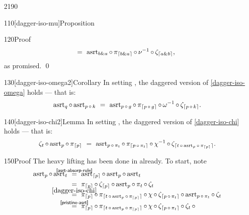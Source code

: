 \begin{parsec}{2190}
\begin{point}{110}[dagger-iso-mu]{Proposition}
\begin{point}{120}{Proof}
\begin{alignat*}{2}
        &\ = \ 
        \asrt_{\andthen{b}{a}}
        \after \pi_{\ceil{\andthen{b}{a}}} 
        \after \nu^{-1} \after \zeta_{\ceil{\andthen{a}{b}}},
\end{alignat*}
as promised. \qed
\end{point}
\end{point}
\begin{point}{130}[dagger-iso-omega2]{Corollary}
In setting ,
    the daggered version of
        \eqref{dagger-iso-omega} holds --- that is:
    \begin{equation*}
\asrt_q \after
\asrt_{p \after k}
    \ =\ 
    \asrt_{p \after g} \after
    \pi_{\ceil{p \after g}} \after
    \omega^{-1} \after
    \zeta_{\lceil p \after k \rceil}.
    \end{equation*}
\end{point}
\spacingfix{}
\begin{point}{140}[dagger-iso-chi2]{Lemma}%
In setting ,
    the daggered version of
        \eqref{dagger-iso-chi} holds --- that is:
    \begin{equation*}
    \zeta_t \after
    \asrt_p \after
    \pi_{\ceil{p}}
    \ = \ 
    \asrt_{p \after \pi_t} \after
    \pi_{\ceil{p \after \pi_t}} \after
    \chi^{-1} \after
    \zeta_{\lceil t \after \asrt_p \after \pi_{\ceil{p}}\rceil}.
    \end{equation*}
\spacingfix{}
\begin{point}{150}{Proof}%
The heavy lifting has been done in  already. To start, note
    \begin{align*}
\asrt_p \after \asrt_t
& \ \overset{\mathclap{\smash{\sref{asrt-absorp-rule}}}}{=}
    \ \asrt_{\ceil{p}} \after \asrt_p  \after \asrt_t \\
    & \ = \ \pi_{\ceil{p}} \after \zeta_{\ceil{p}} \after \asrt_p \after
                    \pi_t \after \zeta_t \\
                    & \ \overset{\mathclap{\smash{\eqref{dagger-iso-chi}}}}{=} \ 
        \pi_{\ceil{p}} \after 
        \pi_{\lceil t \after
        \asrt_p \after \pi_{\ceil{p}}\rceil} \after
        \chi \after \zeta_{\ceil{p \after \pi_t}} \after
        \asrt_{p \after \pi_t} \after
        \zeta_t \\
                    & \ \overset{\mathclap{\smash{\sref{pristine-asrt}}}}{=} \ 
        \pi_{\ceil{p}} \after 
        \pi_{\lceil t \after
        \asrt_p \after \pi_{\ceil{p}}\rceil} \after
        \chi \after \zeta_{\ceil{p \after \pi_t}} \after
        \zeta_t \after

\end{align*}
\end{point}
\end{point}
\end{parsec}
